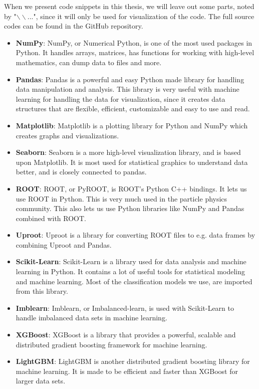 \documentclass[a4paper, american, 12pt]{report}
\begin{document}
	When we present code snippets in this thesis, we will leave out some parts, noted by "$\backslash\backslash$...", since it will only be used for visualization of the code. The full source codes can be found in the GitHub repository. 
	
	\begin{itemize}
		\item \textbf{NumPy}: NumPy, or Numerical Python, is one of the most used packages in Python. It handles arrays, matrices, has functions for working with high-level mathematics, can dump data to files and more.
		\item \textbf{Pandas}: Pandas is a powerful and easy Python made library for handling data manipulation and analysis. This library is very useful with machine learning for handling the data for visualization, since it creates data structures that are flexible, efficient, customizable and easy to use and read.
		\item \textbf{Matplotlib}: Matplotlib is a plotting library for Python and NumPy which creates graphs and visualizations.
		\item \textbf{Seaborn}: Seaborn is a more high-level visualization library, and is based upon Matplotlib. It is most used for statistical graphics to understand data better, and is closely connected to pandas. 
		\item \textbf{ROOT}: ROOT, or PyROOT, is ROOT's Python C++ bindings. It lets us use ROOT in Python. This is very much used in the particle physics community. This also lets us use Python libraries like NumPy and Pandas combined with ROOT.
		\item \textbf{Uproot}: Uproot is a library for converting ROOT files to e.g. data frames by combining Uproot and Pandas.
		\item \textbf{Scikit-Learn}: Scikit-Learn\cite{scikit-learn} is a library used for data analysis and machine learning in Python. It contains a lot of useful tools for statistical modeling and machine learning. Most of the classification models we use, are imported from this library.
		\item \textbf{Imblearn}: Imblearn, or Imbalanced-learn, is used with Scikit-Learn to handle imbalanced data sets in machine learning.
		\item \textbf{XGBoost}: XGBoost is a library that provides a powerful, scalable and distributed gradient boosting framework for machine learning.
		\item \textbf{LightGBM}: LightGBM is another distributed gradient boosting library for machine learning. It is made to be efficient and faster than XGBoost for larger data sets.
	\end{itemize}
	
\end{document}
